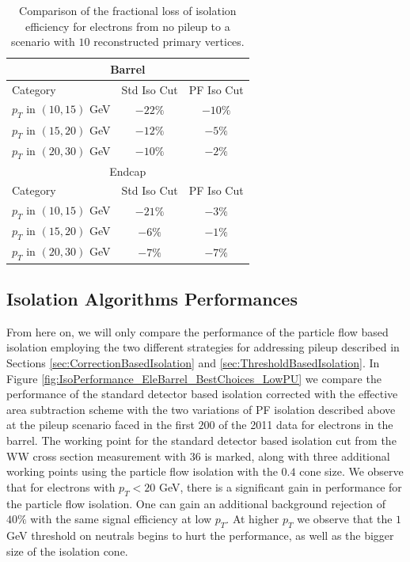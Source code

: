 \begin{table}[!htbp]
\begin{center}
\begin{tabular}{|l|c|c|}
\hline
\multicolumn{3}{|c|}{Barrel} \\
\hline
Category                  & Std Iso Cut & PF Iso Cut \\
\hline
$p_{T}$ in $(10,15)$ GeV  &  $-22\%$    & $-10\%$    \\
$p_{T}$ in $(15,20)$ GeV  &  $-12\%$    & $-5\%$     \\
$p_{T}$ in $(20,30)$ GeV  &  $-10\%$    & $-2\%$     \\
\hline
\multicolumn{3}{|c|}{Endcap} \\
\hline
Category                  & Std Iso Cut & PF Iso Cut \\
\hline
$p_{T}$ in $(10,15)$ GeV  &  $-21\%$    & $-3\%$    \\
$p_{T}$ in $(15,20)$ GeV  &  $-6\%$    & $-1\%$     \\
$p_{T}$ in $(20,30)$ GeV  &  $-7\%$    & $-7\%$     \\

\hline
\end{tabular}
\caption{Comparison of the fractional loss of isolation efficiency for electrons from no 
pileup to a scenario with $10$ reconstructed primary vertices. }
\label{tab:EleIsoEfficiency_LossFromPileup_CompareStdWithPF}
\end{center}
\end{table}





\subsection{Isolation Algorithms Performances}

From here on, we will only compare the performance of the particle flow based isolation employing
the two different strategies for addressing pileup described in Sections 
\ref{sec:CorrectionBasedIsolation} and \ref{sec:ThresholdBasedIsolation}. 
In Figure \ref{fig:IsoPerformance_EleBarrel_BestChoices_LowPU} we compare the performance of the 
standard detector based isolation corrected with the effective area subtraction scheme with the 
two variations of PF isolation described above at the pileup 
scenario faced in the first $200$ \ipb of the 2011 data for electrons in the barrel. The working 
point for the standard detector based isolation cut from the WW  cross section measurement with 
$36$ \ipb is marked, along with three additional working points using the particle flow isolation 
with the $0.4$ cone size. We observe that for electrons with $p_{T} < 20$ GeV, there is a 
significant gain in performance for the particle flow isolation. One can gain an additional 
background rejection of $40\%$ with the same signal efficiency at low $p_{T}$. At higher $p_{T}$ 
we observe that the $1$GeV threshold on neutrals begins to hurt the performance, as well as the 
bigger size of the isolation cone. 


